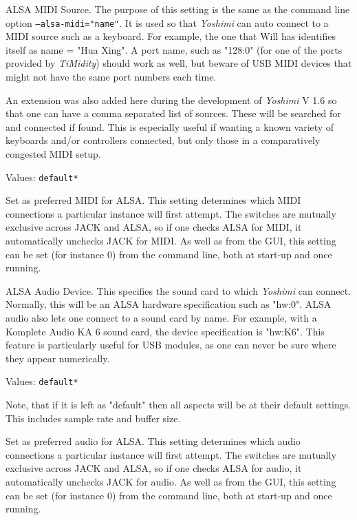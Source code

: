    ALSA MIDI Source.
   The purpose of this setting is the same as the command line option
   \texttt{--alsa-midi="name"}.
   It is used so that \textsl{Yoshimi} can auto connect to a MIDI source
   such as a keyboard.  For example, the one that Will has identifies itself
   as name = "Hua Xing".
   A port name, such as "128:0" (for one of the ports provided by
   \textsl{TiMidity}) should work as well, but beware of USB MIDI devices that
   might not have the same port numbers each time.

   An extension was also added here during the development of
   \textsl{Yoshimi} V 1.6 so that one can have a comma separated list of
   sources. These will be searched for and connected if found. This is
   especially useful if wanting a known variety of keyboards and/or
   controllers connected, but only those in a comparatively congested MIDI
   setup.

   Values: \texttt{default*}

   Set as preferred MIDI for ALSA.
   This setting determines which MIDI connections a particular instance will
   first attempt. The switches are mutually exclusive across JACK and ALSA,
   so if one checks ALSA for MIDI, it automatically unchecks JACK for MIDI.
   As well as from the GUI, this setting can be set (for instance 0) from the
   command line, both at start-up and once running.

   ALSA Audio Device.
   This specifies the sound card to which \textsl{Yoshimi} can connect.
   Normally, this will be an ALSA hardware specification such as
   "hw:0".
   ALSA audio also lets one connect to a sound card by name. For example,
   with a Komplete Audio KA 6 sound card, the device specification is
   "hw:K6". This feature is particularly useful for USB modules, as one can
   never be sure where they appear numerically.

   Values: \texttt{default*}

   Note, that if it is left as "default" then all aspects will be at their
   default settings. This includes sample rate and buffer size.

   Set as preferred audio for ALSA.
   This setting determines which audio connections a particular instance will
   first attempt. The switches are mutually exclusive across JACK and ALSA,
   so if one checks ALSA for audio, it automatically unchecks JACK for audio.
   As well as from the GUI, this setting can be set (for instance 0) from the
   command line, both at start-up and once running.

